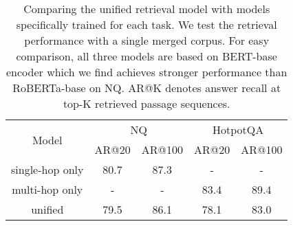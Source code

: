 \begin{table}[h]
    \centering
    \small
    \caption{Comparing the unified retrieval model with models specifically trained for each task. We test the retrieval performance with a single merged corpus. For easy comparison, all three models are based on BERT-base encoder which we find achieves stronger performance than RoBERTa-base on NQ. AR@K denotes answer recall at top-K retrieved passage sequences.}
    \begin{tabular}{c|cccc}
    \toprule
    \multirow{2}{*}{Model} &  \multicolumn{2}{c}{NQ} & \multicolumn{2}{c}{HotpotQA} \\
              & AR@20 & AR@100 & AR@20 & AR@100\\
        \midrule
        single-hop only & 80.7 & 87.3 & - & -\\
        multi-hop only & - & - & 83.4 & 89.4  \\
        unified & 79.5 & 86.1 & 78.1 & 83.0 \\
        \bottomrule
    \end{tabular}
    
    \label{tab:unified}
\end{table}


